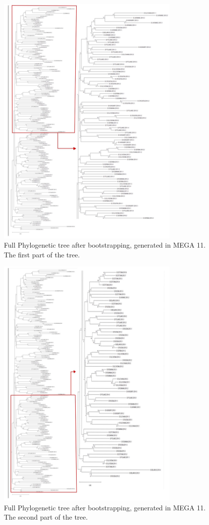 \begin{figure}[h]
  \centering
  \includegraphics[width=0.8\textwidth]{images/ap1.jpg}
  \caption{Full Phylogenetic tree after bootstrapping, generated in MEGA 11. The first part of the tree.}
  \label{fig:example}
\end{figure}

\begin{figure}[h]
  \centering
  \includegraphics[width=0.8\textwidth]{images/ap2.jpg}
  \caption{Full Phylogenetic tree after bootstrapping, generated in MEGA 11. The second part of the tree.}
  \label{fig:example}
\end{figure}